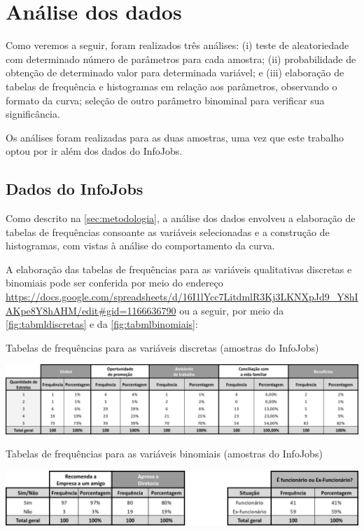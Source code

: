 	\chapter{Análise dos dados}
	
	Como veremos a seguir, foram realizados três análises: (i) teste de aleatoriedade com determinado número de parâmetros para cada amostra; (ii) probabilidade de obtenção de determinado valor para determinada variável; e (iii) elaboração de tabelas de frequência e histogramas em relação aos parâmetros, observando o formato da curva; seleção de outro parâmetro binominal para verificar sua significância.
	
	Os análises foram realizadas para as duas amostras, uma vez que este trabalho optou por ir além dos dados do InfoJobs.
	
	\section{Dados do InfoJobs}
	
	Como descrito na \autoref{sec:metodologia}, a análise dos dados envolveu a elaboração de tabelas de frequências consoante as variáveis selecionadas e a construção de histogramas, com vistas à análise do comportamento da curva.
		
	A elaboração das tabelas de frequências para as variáveis qualitativas discretas e binomiais pode ser conferida por meio do endereço \url{https://docs.google.com/spreadsheets/d/16I1lYcc7LitdmlR3Kj3LKNXpJd9_Y8hIAKpe8Y8hAHM/edit#gid=1166636790} ou a seguir, por meio da \autoref{fig:tabmldiscretas} e da \autoref{fig:tabmlbinomiais}:
	
	\begin{table}
		\centering
		\caption{Tabelas de frequências para as variáveis discretas (amostras do InfoJobs)}
		\label{fig:tabmldiscretas}
		\includegraphics[width=1\linewidth]{img/tab_ml_discretas}
	\end{table}
	
	\begin{table}
		\centering
		\caption{Tabelas de frequências para as variáveis binomiais (amostras do InfoJobs)}
		\label{fig:tabmlbinomiais}
		\includegraphics[width=1\linewidth]{img/tab_ml_binomiais}
	\end{table}


